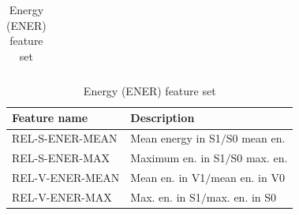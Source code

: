 \documentclass[a4paper]{article}
\begin{document}
\begin{table}
\begin{subtable}{\columnwidth}
{\begin{tabularx}{\columnwidth}{lX}
		
		\bottomrule
		\end{tabularx}
		} %
		\label{tab:f0features}
		\end{subtable}
		
		
		\vspace{1em}
		
		\begin{subtable}{\columnwidth}
		\caption{Energy (ENER) feature set}
		\begin{tabularx}{\columnwidth}{Xl}%
		\toprule
		Feature name & Description \\
		\midrule
		REL-S-ENER-MEAN 
			& Mean energy in S1$/$S0 mean en.
			\\
			
		REL-S-ENER-MAX 
			& Maximum en. in S1$/$S0 max. en.
			\\
			
		REL-V-ENER-MEAN 
			& Mean en. in V1$/$mean en. in V0
			\\
			
		REL-V-ENER-MAX 
			& Max. en. in S1$/$max. en. in S0
			\\
			
			
		\bottomrule
		\end{tabularx}
		\label{tab:enerfeatures}
		\end{subtable}
		
		
		\label{tab:prosfeatures}
		\end{table}
		
\end{document}
